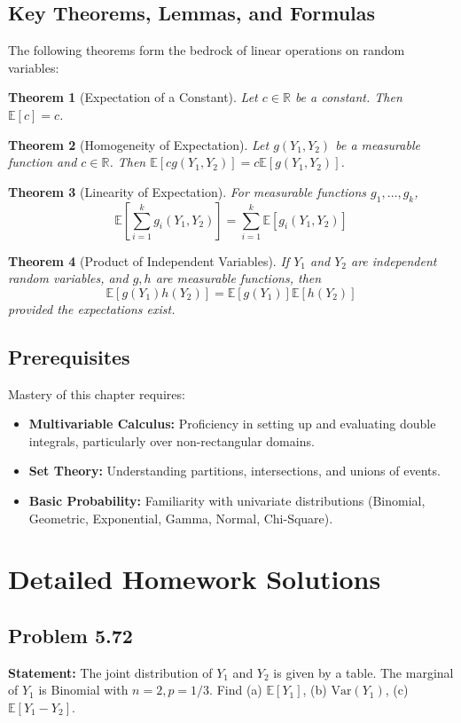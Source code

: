 \documentclass[11pt, a4paper]{article}
\newtheorem{theorem}{Theorem}[section]
\theoremstyle{definition}
\theoremstyle{remark}
\newcommand{\R}{\mathbb{R}}
\newcommand{\E}{\mathbb{E}}
\newcommand{\Var}{\mathrm{Var}}
\begin{document}
\subsection{Key Theorems, Lemmas, and Formulas}
The following theorems form the bedrock of linear operations on random variables:
\begin{theorem}[Expectation of a Constant]
Let $c \in \R$ be a constant. Then $\E[c] = c$.
\end{theorem}
\begin{theorem}[Homogeneity of Expectation]
Let $g(Y_1, Y_2)$ be a measurable function and $c \in \R$. Then $\E[c g(Y_1, Y_2)] = c \E[g(Y_1, Y_2)]$.
\end{theorem}
\begin{theorem}[Linearity of Expectation]
For measurable functions $g_1, \dots, g_k$, 
\[
\E\left[\sum_{i=1}^k g_i(Y_1, Y_2)\right] = \sum_{i=1}^k \E[g_i(Y_1, Y_2)]
\]
\end{theorem}
\begin{theorem}[Product of Independent Variables]
If $Y_1$ and $Y_2$ are independent random variables, and $g, h$ are measurable functions, then
\[
\E[g(Y_1)h(Y_2)] = \E[g(Y_1)]\E[h(Y_2)]
\]
provided the expectations exist.
\end{theorem}

\subsection{Prerequisites}
Mastery of this chapter requires:
\begin{itemize}
    \item \textbf{Multivariable Calculus:} Proficiency in setting up and evaluating double integrals, particularly over non-rectangular domains.
    \item \textbf{Set Theory:} Understanding partitions, intersections, and unions of events.
    \item \textbf{Basic Probability:} Familiarity with univariate distributions (Binomial, Geometric, Exponential, Gamma, Normal, Chi-Square).
\end{itemize}

\newpage
\section{Detailed Homework Solutions}

\subsection{Problem 5.72}
\textbf{Statement:} The joint distribution of $Y_1$ and $Y_2$ is given by a table. The marginal of $Y_1$ is Binomial with $n=2, p=1/3$. Find (a) $\E[Y_1]$, (b) $\Var(Y_1)$, (c) $\E[Y_1 - Y_2]$.
\end{document}
